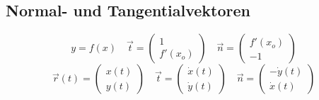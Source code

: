 \subsection{Normal- und Tangentialvektoren}
    \vspace*{0.75em}
    $$
            y = f(x)
        \quad
            \vec{t} = \begin{pmatrix}
                1\\f'(x_o)
            \end{pmatrix}
        \quad 
            \vec{n} = \begin{pmatrix}
                f'(x_o) \\ -1
            \end{pmatrix}
    $$
    \vspace*{-0.25em}
    \vspace*{0.75em}
    $$
            \vec{r}(t) = \begin{pmatrix}
                x(t)\\y(t)
            \end{pmatrix}
        \quad 
            \vec{t} = \begin{pmatrix}
                \dot{x}(t)\\ \dot{y}(t)
            \end{pmatrix}
        \quad 
            \vec{n} = \begin{pmatrix}
                -\dot{y}(t)\\ \dot{x}(t)
            \end{pmatrix}
    $$